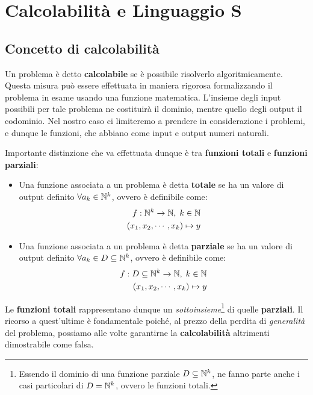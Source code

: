 \chapter{Calcolabilità e Linguaggio S}\label{chapter 1}

\section{Concetto di calcolabilità}

Un problema è detto \textbf{calcolabile} se è possibile risolverlo algoritmicamente.
Questa misura può essere effettuata in maniera rigorosa formalizzando il problema in esame usando una funzione matematica. L'insieme degli input possibili per tale problema ne costituirà il dominio, mentre quello degli output il codominio.
Nel nostro caso ci limiteremo a prendere in considerazione i problemi, e dunque le funzioni, che abbiano come input e output numeri naturali.

Importante distinzione che va effettuata dunque è tra \textbf{funzioni totali}  e \textbf{funzioni parziali}:

\begin{itemize}
  \item Una funzione associata a un problema è detta \textbf{totale} se ha un valore di output definito \(\forall a_k \in \mathbb{N}^k\), ovvero è definibile come:
  \begin{equation}
    \begin{split}
    f: \mathbb{N}^k\rightarrow\mathbb{N},\; k\in\mathbb{N}\\
    (x_1,x_2,\cdots,x_k)\mapsto y
    \end{split}
    \label{Funzione totale Eq}
  \end{equation}

  \item Una funzione associata a un problema è detta \textbf{parziale} se ha un valore di output definito \(\forall a_k \in D\subseteq \mathbb{N}^k\), ovvero è definibile come:
  \begin{equation}
    \begin{split}
    f: D\subseteq\mathbb{N}^k\rightarrow\mathbb{N},\; k\in\mathbb{N}\\
    (x_1,x_2,\cdots,x_k)\mapsto y
    \end{split}
    \label{Funzione parziale Eq}
  \end{equation}
\end{itemize}

Le \textbf{funzioni totali} rappresentano dunque un \textit{sottoinsieme}\footnote{Essendo il dominio di una funzione parziale \(D\subseteq\mathbb{N}^k\), ne fanno parte anche i casi particolari di \(D=\mathbb{N}^k\), ovvero le funzioni totali.} di quelle \textbf{parziali}.
Il ricorso a quest'ultime è fondamentale poiché, al prezzo della perdita di \textit{generalità} del problema, possiamo alle volte garantirne la \textbf{calcolabilità} altrimenti dimostrabile come falsa.


